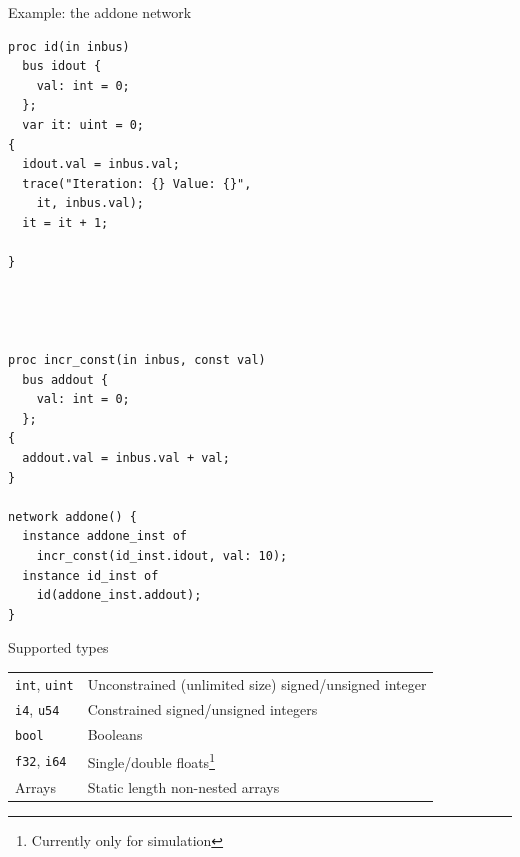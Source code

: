 \documentclass{beamer}
\begin{document}
\begin{frame}[fragile]{Example: the addone network}
  \begin{multicols}{2}
\begin{lstlisting}[language=smeil]
proc id(in inbus)
  bus idout {
    val: int = 0;
  };
  var it: uint = 0;
{
  idout.val = inbus.val;
  trace("Iteration: {} Value: {}",
    it, inbus.val);
  it = it + 1;

}




proc incr_const(in inbus, const val)
  bus addout {
    val: int = 0;
  };
{
  addout.val = inbus.val + val;
}

network addone() {
  instance addone_inst of
    incr_const(id_inst.idout, val: 10);
  instance id_inst of
    id(addone_inst.addout);
}
\end{lstlisting}
  \end{multicols}

\begin{figure}
\end{figure}
\end{frame}


\begin{frame}{Supported types}
  \begin{tabular}{l|l}
    \texttt{int}, \texttt{uint} & Unconstrained (unlimited size) signed/unsigned integer\\
    \texttt{i4}, \texttt{u54} &  Constrained signed/unsigned integers \\
    \texttt{bool} & Booleans \\
    \texttt{f32}, \texttt{i64} & Single/double floats\footnote{Currently only for
                                 simulation}\\
    Arrays & Static length non-nested arrays 
  \end{tabular}
\end{frame}
\end{document}
